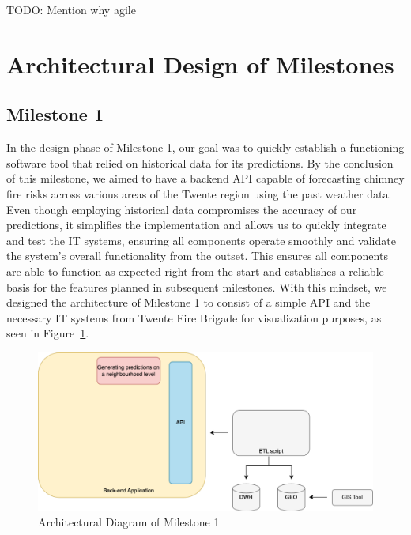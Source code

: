 \documentclass{utitcphd_overleaf}
\begin{document}
TODO: Mention why agile

\section{Architectural Design of Milestones}

\subsection{Milestone 1}

In the design phase of Milestone 1, our goal was to quickly establish a functioning software tool that relied on historical data for its predictions. By the conclusion of this milestone, we aimed to have a backend API capable of forecasting chimney fire risks across various areas of the Twente region using the past weather data. Even though employing historical data compromises the accuracy of our predictions, it simplifies the implementation and allows us to quickly integrate and test the IT systems, ensuring all components operate smoothly and validate the system's overall functionality from the outset. This ensures all components are able to function as expected right from the start and establishes a reliable basis for the features planned in subsequent milestones. With this mindset, we designed the architecture of Milestone 1 to consist of a simple API and the necessary IT systems from Twente Fire Brigade for visualization purposes, as seen in Figure~\ref{fig:iteration_1_arch}.

\begin{figure}[ht]
  \centering
  \includegraphics[width=1\textwidth]{my_images/milestones/iteration_1_arch.pdf}
  \caption{Architectural Diagram of Milestone 1}
  \label{fig:iteration_1_arch}
\end{figure}
\end{document}
